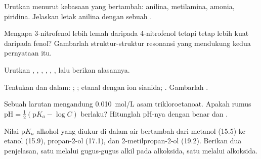 \begin{exercise}[$\star\star$]\label{exo:b1:electronic-effects:6}
Urutkan menurut kebasaan yang bertambah: anilina, metilamina, amonia,
piridina. Jelaskan letak anilina dengan sebuah .
\end{exercise}

\begin{exercise}[$\star\star$]\label{exo:b1:electronic-effects:7}
Mengapa 3-nitrofenol lebih lemah daripada 4-nitrofenol tetapi tetap lebih
kuat daripada fenol? Gambarlah struktur-struktur resonansi yang mendukung
kedua pernyataan itu.
\end{exercise}

\begin{exercise}[$\star\star$]\label{exo:b1:electronic-effects:8}
Urutkan  , , ,
, , , lalu berikan alasannya.
\end{exercise}

\begin{exercise}[$\star\star$]\label{exo:b1:electronic-effects:9}
Tentukan  dan  dalam: ;
; etanal dengan ion sianida; . Gambarlah .
\end{exercise}

\begin{exercise}[$\star\star\star$]\label{exo:b1:electronic-effects:10}
Sebuah larutan mengandung \qty{0.010}{mol/L} asam trikloroetanoat.
Apakah rumus  $\mathrm{pH} = \frac12(\mathrm{p}K_a - \log C)$
berlaku? Hitunglah pH-nya dengan benar dan .
\end{exercise}

\begin{exercise}[$\star\star\star$]\label{exo:b1:electronic-effects:11}
Nilai $\mathrm{p}K_a$ alkohol yang diukur di dalam air bertambah dari
metanol (15.5) ke etanol (15.9), propan-2-ol (17.1), dan
2-metilpropan-2-ol (19.2). Berikan dua penjelasan, satu melalui  gugus-gugus alkil pada alkoksida, satu melalui 
alkoksida.
\end{exercise}

